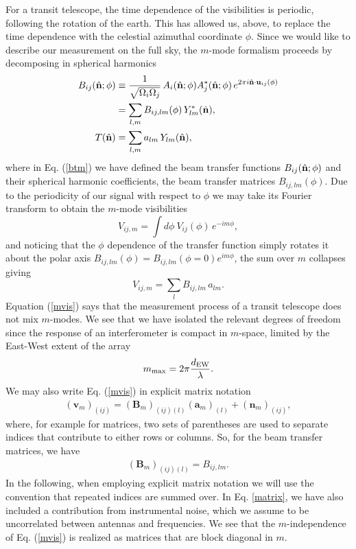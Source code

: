 For a transit telescope, the time dependence of the visibilities is periodic, following the rotation of the earth. This has allowed us, above, to replace the time dependence with the celestial azimuthal coordinate $\phi$. Since we would like to describe our measurement on the full sky, the $m$-mode formalism proceeds by decomposing in spherical harmonics
\begin{align}
 B_{ij}(\hat{\mathbf{n}}; \phi) &\equiv  \frac{1}{\sqrt{\Omega_{i}\Omega_{j}}} \, A_i(\hat{\mathbf{n}}; \phi) A^*_j(\hat{\mathbf{n}}; \phi) \, e^{2\pi i\hat{\mathbf{n}} \cdot \mathbf{u}_{ij}(\phi)}
 \nonumber \\
 &= \sum_{l,m} B_{ij,lm}(\phi) \, Y_{lm}^* (\hat{\mathbf{n}}),
 \label{btm}
 \\
  T(\hat{\mathbf{n}}) &= \sum_{l,m} a_{lm} \, Y_{lm}(\hat{\mathbf{n}}),
 \end{align}
 where in Eq. (\ref{btm}) we have defined the beam transfer functions $B_{ij}(\hat{\mathbf{n}}; \phi)$ and their spherical harmonic coefficients, the beam transfer matrices $B_{ij,lm}(\phi)$. Due to the periodicity of our signal with respect to $\phi$ we may take its Fourier transform to obtain the $m$-mode visibilities
\begin{equation}
V_{ij,m} = \int d\phi ~ V_{ij}(\phi) \, e^{-im\phi},
\end{equation}
and noticing that the $\phi$ dependence of the transfer function simply rotates it about the polar axis $B_{ij,lm}(\phi) = B_{ij,lm}(\phi = 0) e^{im\phi}$, the sum over $m$ collapses giving
\begin{equation}
V_{ij,m} = \sum_{l} B_{ij,lm} \, a_{lm}.
\label{mvis}
\end{equation}
Equation (\ref{mvis}) says that the measurement process of a transit telescope does not mix $m$-modes. We see that we have isolated the relevant degrees of freedom since the response of an interferometer is compact in $m$-space, limited by the East-West extent of the array
\begin{equation}
m_{\rm max} = 2\pi \frac{d_{\rm EW}}{\lambda}.
\end{equation}
We may also write Eq. (\ref{mvis}) in explicit matrix notation
\begin{align}
(\mathbf{v}_m)_{(ij)} = \left( \mathbf{B}_m \right)_{(ij)(l)}(\mathbf{a}_m)_{(l)} + (\mathbf{n}_m)_{(ij)},
\label{matrix}
\end{align}
where, for example for matrices, two sets of parentheses are used to separate indices that contribute to either rows or columns. So, for the beam transfer matrices, we have
\begin{align}
\left( \mathbf{B}_m \right)_{(ij)(l)}  =  B_{ij,lm}.
\end{align}
In the following, when employing explicit matrix notation we will use the convention that repeated indices are summed over. In Eq. \eqref{matrix}, we have also included a contribution from instrumental noise, which we assume to be uncorrelated between antennas and frequencies. We see that the $m$-independence of Eq. (\ref{mvis}) is realized as matrices that are block diagonal in $m$.

